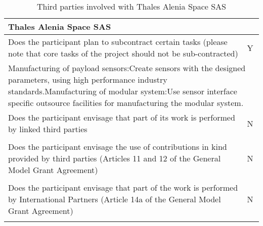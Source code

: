 \begin{table}[H]
	\centering
	\begin{tabular}{|p{10cm}|p{4cm}|}
		\hline
		
		\multicolumn{2}{|p{14cm}|}{\textbf{Thales Alenia Space SAS}}\\
		
		\hline
		
		Does the participant plan to subcontract certain tasks (please note that core tasks of the project should not be sub-contracted) & Y\\
		
		\hline
		
		\multicolumn{2}{|p{14cm}|}{Manufacturing of payload sensors:\newline Create sensors with the designed parameters, using high performance industry standards.\vspace{0.2cm}\newline Manufacturing of modular system:\newline Use sensor interface specific outsource facilities for manufacturing the modular system.}\\
		
		\hline
		
		Does the participant envisage that part of its work is performed by linked third parties & N\\
		
		\hline
		
		\multicolumn{2}{|p{14cm}|}{}\\
		
		\hline
		
		Does the participant envisage the use of contributions in kind provided by third parties (Articles 11 and 12 of the General Model Grant Agreement) & N\\
		
		\hline
		
		\multicolumn{2}{|p{14cm}|}{}\\
		
		\hline
		
		Does the participant envisage that part of the work is performed by International Partners (Article 14a of the General Model Grant Agreement) & N\\
		
		\hline
		
		\multicolumn{2}{|p{14cm}|}{}\\
		
		\hline
	\end{tabular}
	\caption{Third parties involved with Thales Alenia Space SAS}
\end{table}



